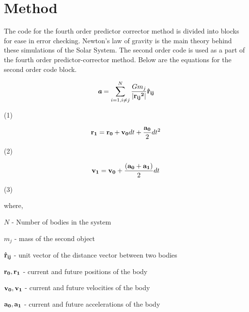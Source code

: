\documentclass{article}
\begin{document}
\section{Method}
{\normalsize{
The code for the fourth order predictor corrector method is divided into blocks for ease in error checking. Newton's law of gravity is the main theory behind these simulations of the Solar System. The second order code is used as a part of the fourth order predictor-corrector method. Below are the equations for the second order code block.}}

\[  \textit{\textbf {a}} = \sum_{i=1, i \neq j}^{N}  \frac{Gm_j} {\left| \bf {r_{ij}}^2 \right|}  \bf{\hat {r}_{ij}} \]  \begin{flushright} (1)  \end{flushright}

\[ {\bf r_1} = {\bf r_0} + {\bf v_0} dt + \frac{{\bf a_0}} {2} dt^2 \]
\begin{flushright} (2)  \end{flushright}

\[ {\bf v_1} = {\bf v_0} + \frac{({\bf a_0}+{\bf a_1})} {2} dt \]
\begin{flushright} (3)  \end{flushright}

where, 

$N$ - Number of bodies in the system 

$m_j$ - mass of the second object

${\bf {\hat {r}_{ij}}}$  - unit vector of the distance vector between two bodies

${\bf r_0, r_1}$ - current and future positions of the body

${\bf v_0, v_1}$ - current and future velocities of the body

${\bf a_0, a_1}$ - current and future accelerations of the body

\end{document}
